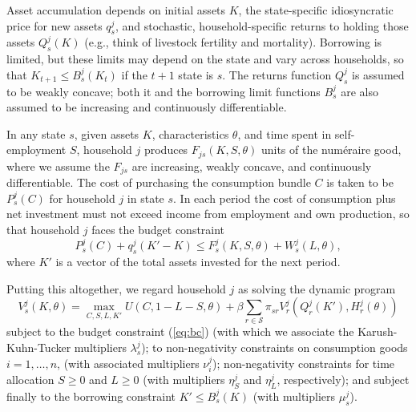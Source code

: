 \documentclass[12pt,letterpaper]{article}
\newcommand{\Eq}[1]{(\ref{eq:#1})}
\begin{document}
Asset accumulation depends on initial assets \(K\), the state-specific
idiosyncratic price for new assets \(q^j_s\), and stochastic, household-specific
returns to holding those assets \(Q^j_{s}(K)\) (e.g., think of livestock
fertility and mortality).  Borrowing is limited, but these limits may depend on the
state and vary across households, so that \(K_{t+1}\leq B^j_{s}(K_t)\)
if the \(t+1\) state is \(s\).  The
returns function \(Q^j_{s}\) is assumed to be weakly concave; both it and
the borrowing limit functions \(B^j_{s}\) are also assumed to be increasing
and continuously differentiable.

In any state \(s\), given assets \(K\), characteristics \(\theta\), and time
spent in self-employment \(S\), household \(j\) produces
\(F_{js}(K,S,\theta)\) units of the numéraire good, where we assume the
\(F_{js}\) are increasing, weakly concave, and continuously
differentiable.  The cost of purchasing the consumption bundle \(C\) is
taken to be \(P^j_s(C)\) for household \(j\) in state \(s\).  In each
period the cost of consumption plus net investment must not exceed
income from employment and own production, so that household \(j\) faces
the budget constraint
\begin{equation} 
\label{eq:bc}
   P^j_s(C) + q^j_s(K'-K) \leq F^j_{s}(K,S,\theta) + W^j_{s}(L,\theta),
\end{equation}
where \(K'\) is a vector of the total assets invested for the next
period.

Putting this altogether, we regard household \(j\) as solving the
dynamic program
\begin{equation}
\label{eq:bellman}
  V^j_{s}(K,\theta)=\max_{C,S,L,K'} U(C,1-L-S,\theta) +
  \beta\sum_{r\in\mathcal{S}}\pi_{sr}V^j_{r}\left(Q^j_{r}(K'),H^j_{r}(\theta)\right)
\end{equation}
subject to the budget constraint \Eq{bc} (with which we associate the
Karush-Kuhn-Tucker multipliers \(\lambda^j_s\)); to non-negativity
constraints on consumption goods \(i=1,\dots,n\), (with associated
multipliers \(\nu_i^j\)); non-negativity constraints for time
allocation \(S\geq 0\) and \(L\geq 0\) (with multipliers \(\eta^j_S\) and
\(\eta^j_L\), respectively); and subject finally to the borrowing
constraint \(K'\leq B^j_{s}(K)\) (with multipliers \(\mu^j_s\)).
\end{document}
